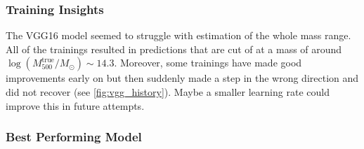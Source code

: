 \subsubsection*{Training Insights}
The VGG16 model seemed to struggle with estimation of the whole mass range. All of the trainings resulted in predictions that are cut of at a mass of around $\log{(M_{500}^{\text{true}}/M_{\odot})} \sim 14.3$. Moreover, some trainings have made good improvements early on but then suddenly made a step in the wrong direction and did not recover (see \autoref{fig:vgg_history}). Maybe a smaller learning rate could improve this in future attempts.

\subsubsection*{Best Performing Model}
